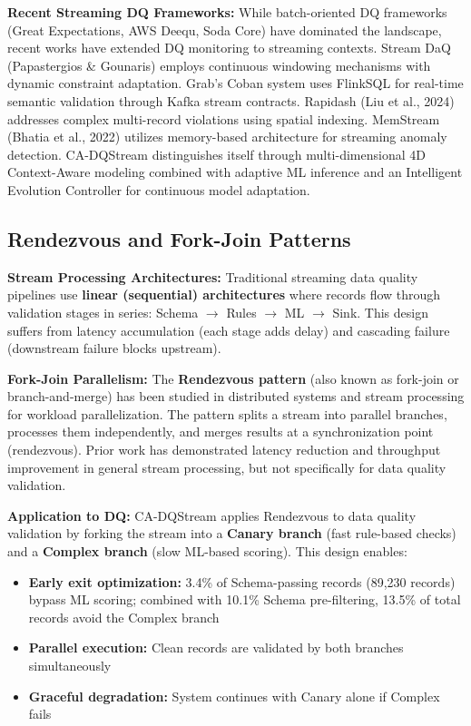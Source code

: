 \textbf{Recent Streaming DQ Frameworks:} While batch-oriented DQ frameworks (Great Expectations, AWS Deequ, Soda Core) have dominated the landscape, recent works have extended DQ monitoring to streaming contexts. Stream DaQ (Papastergios \& Gounaris) employs continuous windowing mechanisms with dynamic constraint adaptation. Grab's Coban system uses FlinkSQL for real-time semantic validation through Kafka stream contracts. Rapidash (Liu et al., 2024) addresses complex multi-record violations using spatial indexing. MemStream (Bhatia et al., 2022) utilizes memory-based architecture for streaming anomaly detection. CA-DQStream distinguishes itself through multi-dimensional 4D Context-Aware modeling combined with adaptive ML inference and an Intelligent Evolution Controller for continuous model adaptation.

\subsection{Rendezvous and Fork-Join Patterns}

\textbf{Stream Processing Architectures:} Traditional streaming data quality pipelines use \textbf{linear (sequential) architectures} where records flow through validation stages in series: Schema $\to$ Rules $\to$ ML $\to$ Sink. This design suffers from latency accumulation (each stage adds delay) and cascading failure (downstream failure blocks upstream).

\textbf{Fork-Join Parallelism:} The \textbf{Rendezvous pattern} (also known as fork-join or branch-and-merge) has been studied in distributed systems and stream processing for workload parallelization. The pattern splits a stream into parallel branches, processes them independently, and merges results at a synchronization point (rendezvous). Prior work has demonstrated latency reduction and throughput improvement in general stream processing, but not specifically for data quality validation.

\textbf{Application to DQ:} CA-DQStream applies Rendezvous to data quality validation by forking the stream into a \textbf{Canary branch} (fast rule-based checks) and a \textbf{Complex branch} (slow ML-based scoring). This design enables:
\begin{itemize}
    \item \textbf{Early exit optimization:} 3.4\% of Schema-passing records (89,230 records) bypass ML scoring; combined with 10.1\% Schema pre-filtering, 13.5\% of total records avoid the Complex branch
    \item \textbf{Parallel execution:} Clean records are validated by both branches simultaneously
    \item \textbf{Graceful degradation:} System continues with Canary alone if Complex fails
\end{itemize}

